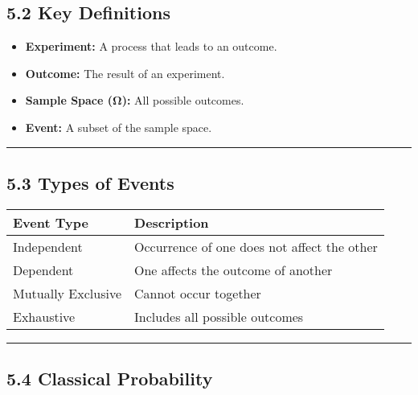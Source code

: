 \documentclass[
  letterpaper,
  DIV=11,
  numbers=noendperiod]{scrreprt}
\providecommand{\tightlist}{%
  \setlength{\itemsep}{0pt}\setlength{\parskip}{0pt}}
\begin{document}
\subsection{5.2 Key Definitions}\label{key-definitions}

\begin{itemize}
\tightlist
\item
  \textbf{Experiment:} A process that leads to an outcome.
\item
  \textbf{Outcome:} The result of an experiment.
\item
  \textbf{Sample Space (Ω):} All possible outcomes.
\item
  \textbf{Event:} A subset of the sample space.
\end{itemize}

\begin{center}\rule{0.5\linewidth}{0.5pt}\end{center}

\subsection{5.3 Types of Events}\label{types-of-events}

\begin{longtable}[]{@{}
  >{\raggedright\arraybackslash}p{}
  >{\raggedright\arraybackslash}p{}@{}}
\toprule\noalign{}
\begin{minipage}[b]{\linewidth}\raggedright
Event Type
\end{minipage} & \begin{minipage}[b]{\linewidth}\raggedright
Description
\end{minipage} \\
\midrule\noalign{}
\endhead
\bottomrule\noalign{}
\endlastfoot
Independent & Occurrence of one does not affect the other \\
Dependent & One affects the outcome of another \\
Mutually Exclusive & Cannot occur together \\
Exhaustive & Includes all possible outcomes \\
\end{longtable}

\begin{center}\rule{0.5\linewidth}{0.5pt}\end{center}

\subsection{5.4 Classical Probability}\label{classical-probability}
\end{document}

